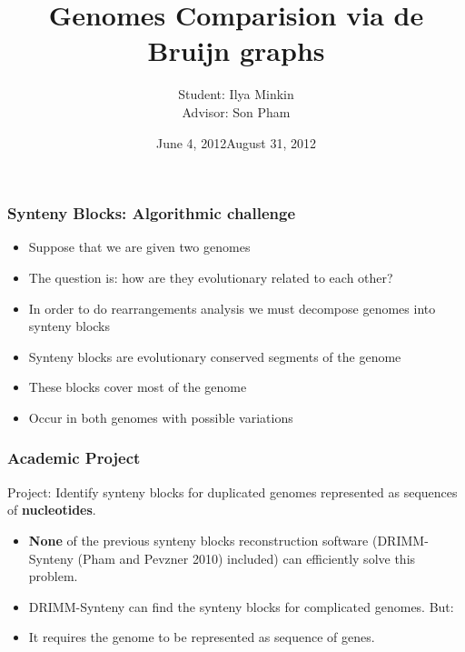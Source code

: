 \documentclass[svgnames,14pt]{beamer}
\title{Genomes Comparision via de Bruijn graphs}
\author{Student: Ilya Minkin \\ Advisor: Son Pham}
\institute{St. Petersburg Academic University}
\date{June 4, 2012}
\begin{document}
\def\braces#1{[#1]}
\newenvironment{changemargin}[2]{%
  \begin{list}{}{%
    \setlength{\topsep}{0pt}%
    \setlength{\leftmargin}{#1}%
    \setlength{\rightmargin}{#2}%
    \setlength{\listparindent}{\parindent}%
    \setlength{\itemindent}{\parindent}%
    \setlength{\parsep}{\parskip}%
  }%
  \item[]}{\end{list}}
\date{August 31, 2012}
\maketitle

\begin{frame}
\frametitle{Synteny Blocks: Algorithmic challenge}
\begin{itemize}
\item Suppose that we are given two genomes
\item The question is: how are they evolutionary related to each other?
\item In order to do rearrangements analysis we must decompose genomes into synteny blocks
\item Synteny blocks are evolutionary conserved segments of the genome
\item These blocks cover most of the genome
\item Occur in both genomes with possible variations
\end{itemize}
\end{frame}

\begin{frame}
\frametitle{Academic Project}
Project: Identify synteny blocks for duplicated genomes represented as sequences of \textbf{nucleotides}.
\begin{itemize}
\item \textbf{None} of the previous synteny blocks reconstruction software (DRIMM-Synteny (Pham and Pevzner 2010) included) can 
efficiently solve this problem. 
\item DRIMM-Synteny can find the synteny blocks for complicated genomes. But:
\pause \item It requires the genome to be represented as sequence of genes. 
\end{itemize}
\end{frame}
\end{document}
